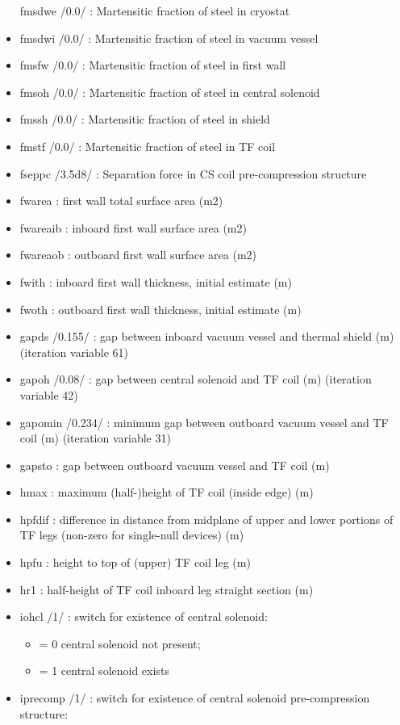 \documentclass[]{article}
\begin{document}
\begin{itemize}
  fmsdwe /0.0/ : Martensitic fraction of steel in cryostat
\item
  fmsdwi /0.0/ : Martensitic fraction of steel in vacuum vessel
\item
  fmsfw /0.0/ : Martensitic fraction of steel in first wall
\item
  fmsoh /0.0/ : Martensitic fraction of steel in central solenoid
\item
  fmssh /0.0/ : Martensitic fraction of steel in shield
\item
  fmstf /0.0/ : Martensitic fraction of steel in TF coil
\item
  fseppc /3.5d8/ : Separation force in CS coil pre-compression structure
\item
  fwarea : first wall total surface area (m2)
\item
  fwareaib : inboard first wall surface area (m2)
\item
  fwareaob : outboard first wall surface area (m2)
\item
  fwith : inboard first wall thickness, initial estimate (m)
\item
  fwoth : outboard first wall thickness, initial estimate (m)
\item
  gapds /0.155/ : gap between inboard vacuum vessel and thermal shield
  (m) (iteration variable 61)
\item
  gapoh /0.08/ : gap between central solenoid and TF coil (m) (iteration
  variable 42)
\item
  gapomin /0.234/ : minimum gap between outboard vacuum vessel and TF
  coil (m) (iteration variable 31)
\item
  gapsto : gap between outboard vacuum vessel and TF coil (m)
\item
  hmax : maximum (half-)height of TF coil (inside edge) (m)
\item
  hpfdif : difference in distance from midplane of upper and lower
  portions of TF legs (non-zero for single-null devices) (m)
\item
  hpfu : height to top of (upper) TF coil leg (m)
\item
  hr1 : half-height of TF coil inboard leg straight section (m)
\item
  iohcl /1/ : switch for existence of central solenoid:

  \begin{itemize}
  \itemsep1pt\parskip0pt
  \item
    = 0 central solenoid not present;
  \item
    = 1 central solenoid exists
  \end{itemize}
\item
  iprecomp /1/ : switch for existence of central solenoid
  pre-compression structure:


\end{itemize}
\end{document}
